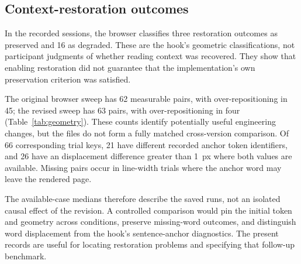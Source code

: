 \subsection{Context-restoration outcomes}
\label{sec:geometry-results}

In the recorded \on{} sessions, the browser classifies three restoration outcomes as preserved and 16 as degraded. These are the hook's geometric classifications, not participant judgments of whether reading context was recovered. They show that enabling restoration did not guarantee that the implementation's own preservation criterion was satisfied.

\begin{table}[tb]
\caption{Exploratory browser geometry records. Displacement medians use available observations, with counts in parentheses. Over-repositioning uses complete \off{}/\on{} pairs and a 1~px tolerance. Anchors differ in 21 of 66 trial keys across versions, precluding a matched effect estimate.}
\label{tab:geometry}
\centering

\end{table}

The original browser sweep has 62 measurable pairs, with over-repositioning in 45; the revised sweep has 63 pairs, with over-repositioning in four (Table~\ref{tab:geometry}). These counts identify potentially useful engineering changes, but the files do not form a fully matched cross-version comparison. Of 66 corresponding trial keys, 21 have different recorded anchor token identifiers, and 26 have an \off{} displacement difference greater than 1~px where both values are available. Missing pairs occur in line-width trials where the anchor word may leave the rendered page.

The available-case medians therefore describe the saved runs, not an isolated causal effect of the revision. A controlled comparison would pin the initial token and geometry across conditions, preserve missing-word outcomes, and distinguish word displacement from the hook's sentence-anchor diagnostics. The present records are useful for locating restoration problems and specifying that follow-up benchmark.
